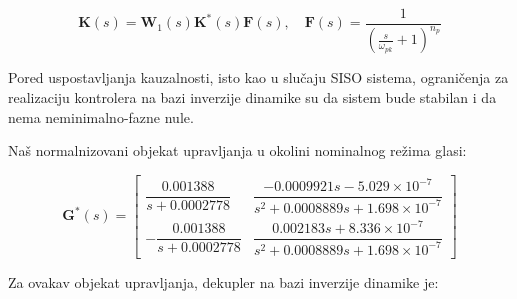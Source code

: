 \documentclass[a4paper,11pt]{article}
\theoremstyle{definition} \newtheorem{deff}{Definicija}[section]
\theoremstyle{definition} \newtheorem{prim}[deff]{Primer}
\theoremstyle{plain} \newtheorem{teor}[deff]{Teorema}
\begin{document}
	\begin{equation}
		\textbf{K}(s) = \textbf{W}_1(s) \textbf{K}^*(s) \textbf{F}(s), \quad \textbf{F}(s) = \frac{1}{{(\frac{s}{\omega_{pk}} + 1)}^{n_p}}
	\end{equation}
	
	Pored uspostavljanja kauzalnosti, isto kao u slučaju SISO sistema, ograničenja za realizaciju kontrolera na bazi inverzije dinamike su da sistem bude stabilan i da nema neminimalno-fazne nule. \\
	\clearpage
	
	Naš normalnizovani objekat upravljanja u okolini nominalnog režima glasi: 
	
		
		\begin{equation}
			\textbf{G}^*(s) = \begin{bmatrix} 
				\dfrac{0.001388}{s + 0.0002778} & \dfrac{-0.0009921s - 5.029 \times 10^{-7}}{s^2 + 0.0008889s + 1.698 \times 10^{-7}} \\
				-\dfrac{0.001388}{s + 0.0002778} & \dfrac{0.002183s + 8.336 \times 10^{-7}}{s^2 + 0.0008889s + 1.698 \times 10^{-7}}
			\end{bmatrix}
		\end{equation}
		\vspace{1cm}
		
		Za ovakav objekat upravljanja, dekupler na bazi inverzije dinamike je:
		
\end{document}
